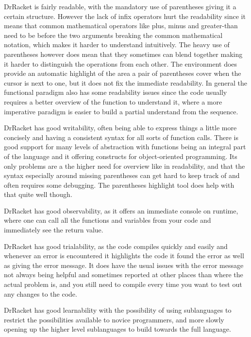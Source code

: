 \begin{description}[style=nextline]
\item[Readability] DrRacket is fairly readable, with the mandatory use of parentheses giving it a certain structure.
However the lack of infix operators hurt the readability since it means that common mathematical operators like plus, minus and greater-than need to be before the two arguments breaking the common mathematical notation, which makes it harder to understand intuitively.
The heavy use of parentheses however does mean that they sometimes can blend together making it harder to distinguish the operations from each other.
The environment does provide an automatic highlight of the area a pair of parentheses cover when the cursor is next to one, but it does not fix the immediate readability.
In general the functional paradigm also has some readability issues since the code usually requires a better overview of the function to understand it, where a more imperative paradigm is easier to build a partial understand from the sequence.
\item[Writability] DrRacket has good writability, often being able to express things a little more concisely and having a consistent syntax for all sorts of function calls.
There is good support for many levels of abstraction with functions being an integral part of the language and it offering constructs for object-oriented programming.
Its only problems are a the higher need for overview like in readability, and that the syntax especially around missing parentheses can get hard to keep track of and often requires some debugging.
The parentheses highlight tool does help with that quite well though.
\item[Observability] DrRacket has good observability, as it offers an immediate console on runtime, where one can call all the functions and variables from your code and immediately see the return value.
\item[Trialability] DrRacket has good trialability, as the code compiles quickly and easily and whenever an error is encountered it highlights the code it found the error as well as giving the error message.
It does have the usual issues with the error message not always being helpful and sometimes reported at other places than where the actual problem is, and you still need to compile every time you want to test out any changes to the code.
\item[Learnability] DrRacket has good learnability with the possibility of using sublanguages to restrict the possibilities available to novice programmers, and more slowly opening up the higher level sublanguages to build towards the full language.

\end{description}
